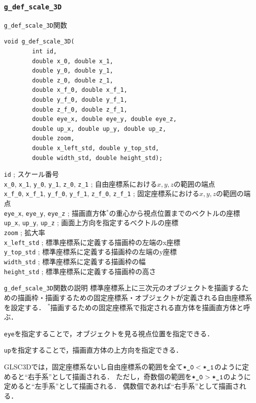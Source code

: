 \documentclass[platex,a4paper,12pt]{jsarticle}%
\begin{document}
\clearpage
\subsubsection{\texttt{g\_def\_scale\_3D}}

\begin{itembox}[l]{\texttt{g\_def\_scale\_3D}関数}
\begin{verbatim}
void g_def_scale_3D(
        int id,
        double x_0, double x_1,
        double y_0, double y_1,
        double z_0, double z_1,
        double x_f_0, double x_f_1, 
        double y_f_0, double y_f_1, 
        double z_f_0, double z_f_1, 
        double eye_x, double eye_y, double eye_z,
        double up_x, double up_y, double up_z, 
        double zoom, 
        double x_left_std, double y_top_std,
        double width_std, double height_std);
\end{verbatim}
\verb|id| ; スケール番号 \\
\verb|x_0|, \verb|x_1|, \verb|y_0|, \verb|y_1|, \verb|z_0|, \verb|z_1| ; 自由座標系における$x, y, z$の範囲の端点 \\
\verb|x_f_0|, \verb|x_f_1|, \verb|y_f_0|, \verb|y_f_1|, \verb|z_f_0|, \verb|z_f_1| ; 固定座標系における$x, y, z$の範囲の端点 \\
\verb|eye_x|, \verb|eye_y|, \verb|eye_z| ; 描画直方体$^*$の重心から視点位置までのベクトルの座標 \\
\verb|up_x|, \verb|up_y|, \verb|up_z| ; 画面上方向を指定するべクトルの座標 \\
\verb|zoom| ; 拡大率 \\
\verb|x_left_std| ; 標準座標系に定義する描画枠の左端のx座標 \\
\verb|y_top_std| ; 標準座標系に定義する描画枠の左端のy座標 \\
\verb|width_std| ; 標準座標系に定義する描画枠の幅 \\
\verb|height_std| ; 標準座標系に定義する描画枠の高さ
\end{itembox}

\begin{itembox}[l]{\texttt{g\_def\_scale\_3D}関数の説明}
標準座標系上に三次元のオブジェクトを描画するための描画枠・描画するための固定座標系・オブジェクトが定義される自由座標系を設定する．
$^*$描画するための固定座標系で指定される直方体を描画直方体と呼ぶ．

\verb|eye|を指定することで，オブジェクトを見る視点位置を指定できる．

\verb|up|を指定することで，描画直方体の上方向を指定できる．

GLSC3Dでは，固定座標系ないし自由座標系の範囲を全て$\verb|*_0| < \verb|*_1|$のように定めると``右手系''として描画される．
ただし，奇数個の範囲を$\verb|*_0| > \verb|*_1|$のように定めると``左手系''として描画される．
偶数個であれば``右手系''として描画される．
\end{itembox}
\end{document}
